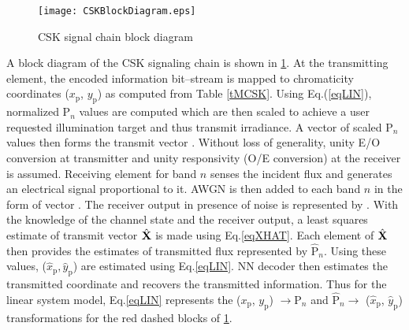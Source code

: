 \begin{figure}[!t]
	\centering
		\texttt{[image: CSKBlockDiagram.eps]}
	\caption{CSK signal chain block diagram}
	\label{figCSKBD}
\end{figure}

A block diagram of the CSK signaling chain is shown in \figurename{ }\ref{figCSKBD}. At the transmitting element, the encoded information bit--stream is mapped to chromaticity coordinates ($x_{\text{p}}$, $y_{\text{p}}$) as computed from Table \ref{tMCSK}. Using Eq.(\ref{eqLIN}), normalized P$_{n}$ values are computed which are then scaled to achieve a user requested illumination target and thus transmit irradiance. A vector of scaled P$_{n}$ values then forms the transmit vector . Without loss of generality, unity E/O conversion at transmitter and unity responsivity (O/E conversion) at the receiver is assumed. Receiving element for band $n$ senses the incident flux and generates an electrical signal proportional to it. AWGN is then added to each band $n$ in the form of vector . The receiver output in presence of noise is represented by . With the knowledge of the channel state and the receiver output, a least squares estimate of transmit vector $\hat{{\bf{X}}}$ is made using Eq.\eqref{eqXHAT}. Each element of $\hat{{\bf{X}}}$ then provides the estimates of transmitted flux represented by $\hat{\text{P}}_{n}$. Using these values, ($\hat{x}_{\text{p}}, \hat{y}_{\text{p}}$) are estimated using Eq.\eqref{eqLIN}. NN decoder then estimates the transmitted coordinate and recovers the transmitted information. Thus for the linear system model, Eq.\eqref{eqLIN} represents the ($x_{\text{p}}$, $y_{\text{p}}$) $\rightarrow  \text{P}_{n}$ and $\hat{\text{P}}_{n}\rightarrow$ ($\hat{x}_{\text{p}}$, $\hat{y}_{\text{p}}$) transformations for the red dashed blocks of \figurename{ }\ref{figCSKBD}.

